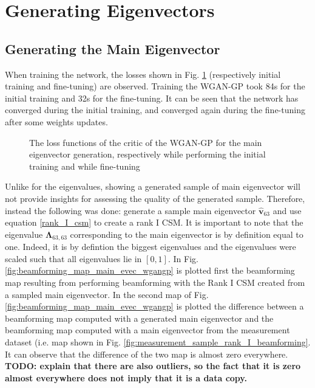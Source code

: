 \documentclass[11pt,a4paper,twoside]{report}
\begin{document}
\section{Generating Eigenvectors}

\subsection{Generating the Main Eigenvector}

When training the network, the losses shown in Fig. \ref{fig:loss_main_evec_wgangp} (respectively initial training and fine-tuning) are observed. Training the WGAN-GP took 84s for the initial training and 32s for the fine-tuning. It can be seen that the network has converged during the initial training, and converged again during the fine-tuning after some weights updates.

\begin{figure}
    \centering
    \caption{The loss functions of the critic of the WGAN-GP for the main eigenvector generation, respectively while performing the initial training and while fine-tuning}
    \label{fig:loss_main_evec_wgangp}
\end{figure}

Unlike for the eigenvalues, showing a generated sample of main eigenvector will not provide insights for assessing the quality of the generated sample. Therefore, instead the following was done: generate a sample main eigenvector $\hat{\mathbf{v}}_{63}$ and use equation \ref{rank_I_csm} to create a rank I CSM. It is important to note that the eigenvalue $\mathbf{\Lambda}_{63, 63}$ corresponding to the main eigenvector is by definition equal to one. Indeed, it is by defintion the biggest eigenvalues and the eigenvalues were scaled such that all eigenvalues lie in $[0,1]$.  In Fig. \ref{fig:beamforming_map_main_evec_wgangp} is plotted first the beamforming map resulting from performing beamforming with the Rank I CSM created from a sampled main eigenvector. In the second map of Fig. \ref{fig:beamforming_map_main_evec_wgangp} is plotted the difference between a beamforming map computed with a generated main eigenvector and the beamforming map computed with a main eigenvector from the measurement dataset (i.e. map shown in Fig. \ref{fig:measurement_sample_rank_I_beamforming}. It can observe that the difference of the two map is almost zero everywhere. \textbf{TODO: explain that there are also outliers, so the fact that it is zero almost everywhere does not imply that it is a data copy.}
\end{document}
